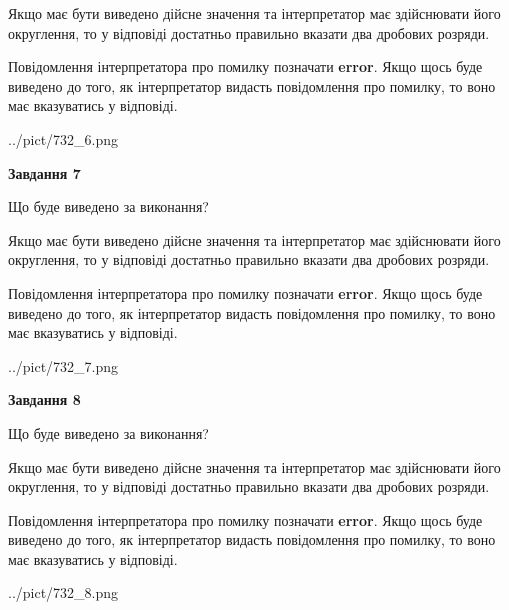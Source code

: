 \documentclass[12pt, ukrainian]{article}
\begin{document}
{\begin {Large}
Якщо має бути виведено дійсне значення та інтерпретатор має здійснювати його округлення, 
то у відповіді достатньо правильно вказати два дробових розряди.

Повідомлення інтерпретатора про помилку позначати \textbf{error}.
Якщо щось буде виведено до того, як інтерпретатор видасть повідомлення про помилку, 
то воно має вказуватись у відповіді. \par

\begin{center}
	{../pict/732_6.png}
\end{center}
\newpage

{\begin {center}\textbf{Завдання 7}\end {center}}\par
Що буде виведено за виконання? \par

Якщо має бути виведено дійсне значення та інтерпретатор має здійснювати його округлення, 
то у відповіді достатньо правильно вказати два дробових розряди.

Повідомлення інтерпретатора про помилку позначати \textbf{error}.
Якщо щось буде виведено до того, як інтерпретатор видасть повідомлення про помилку, 
то воно має вказуватись у відповіді. \par

\begin{center}
	{../pict/732_7.png}
\end{center}
\newpage

{\begin {center}\textbf{Завдання 8}\end {center}}\par
Що буде виведено за виконання? \par

Якщо має бути виведено дійсне значення та інтерпретатор має здійснювати його округлення, 
то у відповіді достатньо правильно вказати два дробових розряди.

Повідомлення інтерпретатора про помилку позначати \textbf{error}.
Якщо щось буде виведено до того, як інтерпретатор видасть повідомлення про помилку, 
то воно має вказуватись у відповіді. \par

\begin{center}
	{../pict/732_8.png}
\end{center}
\newpage


\end{Large}}
\end{document}

